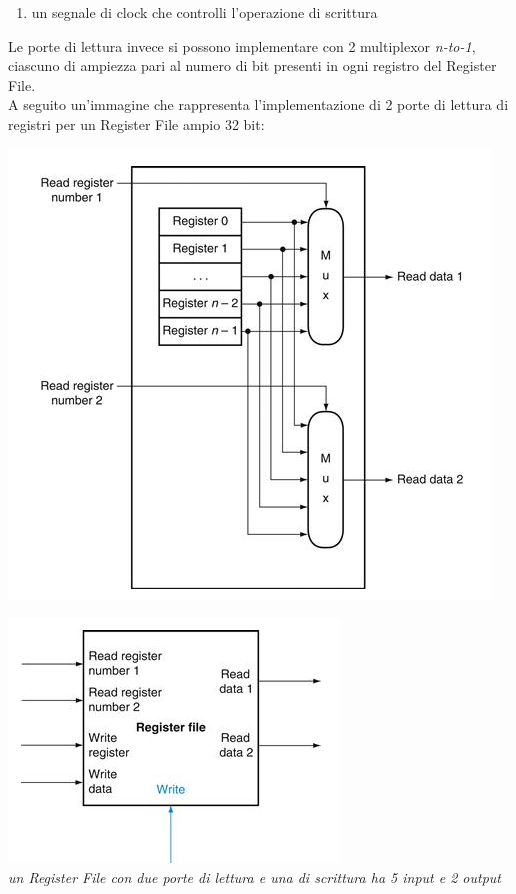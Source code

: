 \documentclass[a4paper,12pt, oneside]{book}
\begin{document}
\begin{itemize}
\begin{enumerate}
    \item un segnale di clock che controlli l'operazione di scrittura
  \end{enumerate}
  Le porte di lettura invece si possono implementare con 2 multiplexor \textit{n-to-1}, ciascuno di ampiezza pari al numero di bit presenti in ogni registro del Register File.
  \\A seguito un'immagine che rappresenta l'implementazione di 2 porte di lettura di registri per un Register File ampio 32 bit:
  \begin{center}
    \includegraphics[scale=0.7]{img/reg2.png}
  \end{center}
  \newpage
  \begin{center}
    \includegraphics[scale=0.7]{img/reg1.png}\\
    \textit{un Register File con due porte di lettura e una di scrittura ha 5 input e 2 output }

\end{center}
\end{itemize}
\end{document}
